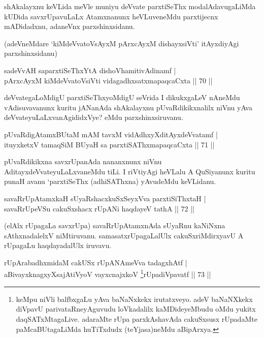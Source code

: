 \begin{artha}
shAkalayxnu keVLida meVle muniyu deVvate parxtiSeThx modalAdavugaLiMda kUDida savxrUpavuLaLx Atamxnanunx heVLuveneMdu parxtijecnx mADidadxnu, adaneVnx parxshinxsidanu.

(adeVneMdare `kiMdeVvatoV\s sAyxM pArxcAyxM dishayxsiVti' itAyxdiyAgi parxshinxsidanu)
\end{artha}


\begin{shl}
sadeVvAH saparxtiSeThxYtA dishoV\s hamitivAdinamf |\\
pArxcAyxM kiMdeVvatoV\s siVti vidagadhxsatxmapaqcaCxta \hfill || 70 ||
\end{shl}

\begin{artha}
deVvategaLoMdigU parxtiSeThxyoMdigU seVrida I dikukxgaLeV nAneMdu vAdisuvavanunx kuritu jANanAda shAkalayxnu pUvaRdikikxnalilx niVnu yAva deVvateyuLaLxvanAgididxVye? eMdu parxshinxsiruvanu.
\end{artha}


\begin{shl}
pUvaRdigAtamxBUtaM mAM tavxM vidAdhxyXditAyxdeVvatamf |\\
ituyxketxV tamaqSiM BUyaH sa parxtiSAThxmapaqcaCxta \hfill || 71 ||
\end{shl}

\begin{artha}
pUvaRdikikxna savxrUpanAda nananxnunx niVnu AditayxdeVvateyuLaLxvaneMdu tiLi. I riVtiyAgi heVLalu A QuSiyanunx kuritu punaH avanu `parxtiSeThx (adhiSAThxna) yAvudeMdu keVLidanu.
\end{artha}

\begin{shl}
savaRrUpAtamxkaH sUyaRshacxkuSxSeyxVva parxtiSiThxtaH |\\
savaRrUpeVSu cakuSxshacx rUpANi haqdayeV tathA \hfill || 72 ||
\end{shl}

\begin{artha}
(elAlx rUpagaLa savxrUpa) savaRrUpAtamxnAda sUyaRnu kaNiNxna sAthxnadalelxV niMtiruvanu. samasatxrUpagaLalUlx cakuSxriMdirxyavU A rUpagaLu haqdayadalUlx iruvavu.
\end{artha}

\begin{shl}
rUpArabadhxmidaM cakUSx rUpANAmeVva tadagxhAtf |\\
aBivayxknagxyXsajAtiVyoV vayxcnajxkoV \footnote{keMpu niVli balfbxgaLu yAva baNaNxkekx irutatxveyo. adeV baNaNXkekx diVpavU parivataRneyAguvudu loVkadalilx kaMDideyeMbudu oMdu yukitx daqSATxMtagaLive. adaraMte rUpa parxkAshavAda cakuSxsusx rUpadaMte paMcaBUtagaLiMda huTiTxdudx (teYjasa)neMdu aBipArxya.}rUpadiVpavatf \hfill || 73 ||
\end{shl}

